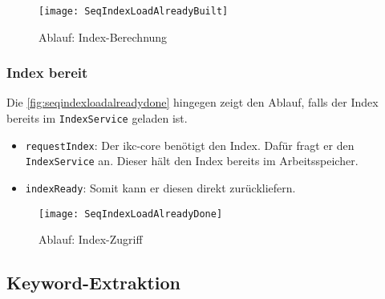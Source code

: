     \begin{figure}[H]
    \centering
    \texttt{[image: SeqIndexLoadAlreadyBuilt]}
    \caption{Ablauf: Index-Berechnung}
    \label{fig:seqindexalreadybuilt}
    \end{figure}
    
    
    
\subsubsection{Index bereit}



Die \autoref{fig:seqindexloadalreadydone} hingegen zeigt den Ablauf, falls der Index bereits im \texttt{IndexService} geladen ist.

\begin{itemize}
    \item \texttt{requestIndex}: Der \gls{ikc-core} benötigt den Index. Dafür fragt er den \texttt{IndexService} an. Dieser hält den Index bereits im Ar\-beits\-spei\-cher.
    \item \texttt{indexReady}: Somit kann er diesen direkt zurückliefern.
\end{itemize}
    
    \begin{figure}[H]
    \centering
    \texttt{[image: SeqIndexLoadAlreadyDone]}
    \caption{Ablauf: Index-Zugriff}
    \label{fig:seqindexloadalreadydone}
    \end{figure}

 
     
\subsection{Keyword-Extraktion}



